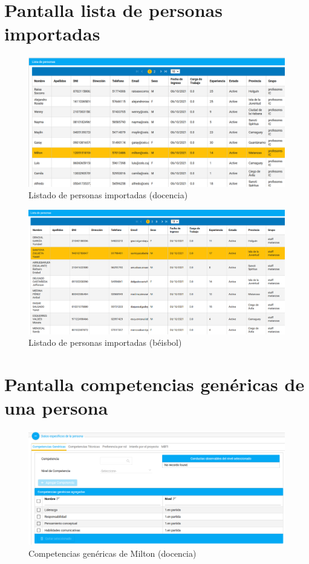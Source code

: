 {\chapter{Pantalla lista de personas importadas}
\begin{figure}[H]
	\centering
	\includegraphics[width=\textwidth]{figuras/milton_seleccionado.png}
	\caption{Listado de personas importadas (docencia)} \label{fig:lista_profesores_docencia}
\end{figure}

\begin{figure}[H]
	\centering
	\includegraphics[width=\textwidth]{figuras/besibol_santoya_seleccionado.png}
	\caption{Listado de personas importadas (béisbol)} \label{fig:lista_jugadores_beisbol}
\end{figure}




\chapter{Pantalla competencias genéricas de una persona}
\begin{figure}[H]
	\centering
	\includegraphics[width=\textwidth]{figuras/milton_comp_genericas.png}
	\caption{Competencias genéricas de Milton (docencia)} \label{fig:comp_genericas_docencia}
\end{figure}

}
